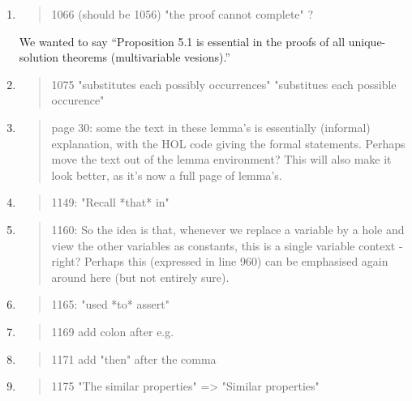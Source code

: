 \begin{enumerate}
  \item \begin{quote}
1066 (should be 1056) "the proof cannot complete" ?
\end{quote}
  \Mark We wanted to say ``Proposition 5.1 is essential in the proofs of all unique-solution
theorems (multivariable vesions).''

  \item \begin{quote}
1075 "substitutes each possibly occurrences" "substitues each possible occurence"
\end{quote}
  \Mark

  \item \begin{quote}
page 30: some the text in these lemma's is essentially (informal) explanation, with the HOL code giving the formal statements. Perhaps move the text out of the lemma environment? This will also make it look better, as it's now a full page of lemma's. 
\end{quote}
  \Mark

  \item \begin{quote}
1149: "Recall *that* in"
\end{quote}
  \Mark

  \item \begin{quote}
1160: So the idea is that, whenever we replace a variable by a hole and view the other variables as constants, this is a single variable context - right? Perhaps this (expressed in line 960) can be emphasised again around here (but not entirely sure). 
\end{quote}
  \Mark

  \item \begin{quote}
1165: "used *to* assert"
\end{quote}
  \Mark

  \item \begin{quote}
1169 add colon after e.g.
\end{quote}
  \Mark

  \item \begin{quote}
1171 add "then" after the comma 
\end{quote}
  \Mark

  \item \begin{quote}
1175 "The similar properties" => "Similar properties"
\end{quote}
  \Mark


\end{enumerate}
